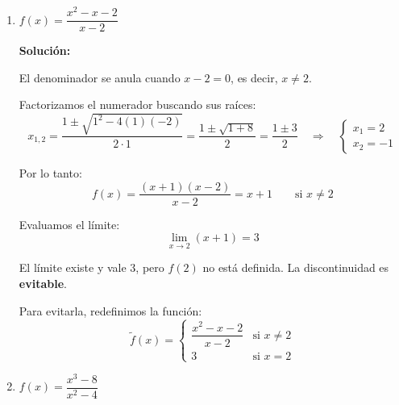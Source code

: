 \documentclass[12pt]{article}
\newcommand{\solucion}{%
    \vspace{0.8em}%
    \textbf{Solución:}%
}
\begin{document}
\begin{enumerate}[label=\alph*)]

    \item $f(x) = \dfrac{x^2 - x - 2}{x - 2}$

    \solucion

    El denominador se anula cuando $x - 2 = 0$, es decir, $x \neq 2$.

    Factorizamos el numerador buscando sus raíces:
    \[
    x_{1,2} = \frac{1 \pm \sqrt{1^2 - 4(1)(-2)}}{2 \cdot 1} = \frac{1 \pm \sqrt{1+8}}{2} = \frac{1 \pm 3}{2}
    \quad \Rightarrow \quad
    \begin{cases} x_1 = 2 \\ x_2 = -1 \end{cases}
    \]

    Por lo tanto:
    \[
    f(x) = \frac{(x+1)(x-2)}{x-2} = x + 1 \qquad \text{si } x \neq 2
    \]

    Evaluamos el límite:
    \[
    \lim_{x \to 2} (x+1) = 3
    \]

    El límite existe y vale $3$, pero $f(2)$ no está definida. La discontinuidad es \textbf{evitable}.

    Para evitarla, redefinimos la función:
    \[
    \widetilde{f}(x) = \begin{cases} \dfrac{x^2 - x - 2}{x - 2} & \text{si } x \neq 2 \\[0.5em] 3 & \text{si } x = 2 \end{cases}
    \]

    \begin{center}
    \end{center}

    \newpage
    \item $f(x) = \dfrac{x^3 - 8}{x^2 - 4}$


\end{enumerate}
\end{document}
